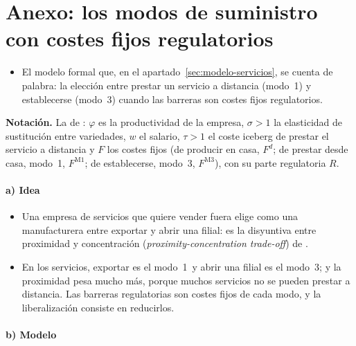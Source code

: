 \documentclass[11pt]{article}
\begin{document}
\clearpage
\appendix

\section{Anexo: los modos de suministro\cortetitulo{} con costes fijos regulatorios}\label{anexo:modelo-servicios}

\begin{itemize}
\item El modelo formal que, en el apartado~\ref{sec:modelo-servicios}, se cuenta de palabra: la elección entre prestar un servicio a distancia (modo~1) y establecerse (modo~3) cuando las barreras son costes fijos regulatorios.
\end{itemize}

\begin{anotaciones}
\textbf{Notación.} La de : $\varphi$ es la productividad de la empresa, $\sigma>1$ la elasticidad de sustitución entre variedades, $w$ el salario, $\tau>1$ el coste iceberg de prestar el servicio a distancia y $F$ los costes fijos (de producir en casa, $F^d$; de prestar desde casa, modo~1, $F^{\mathrm{M1}}$; de establecerse, modo~3, $F^{\mathrm{M3}}$), con su parte regulatoria $R$.
\end{anotaciones}

\paragraph{a) Idea}

\begin{itemize}
\item Una empresa de servicios que quiere vender fuera elige como una manufacturera entre exportar y abrir una filial: es la disyuntiva entre proximidad y concentración (\emph{proximity-concentration trade-off}) de \textcite{HelpmanMelitzYeaple2004Export} .
\item En los servicios, exportar es el modo~1~y abrir una filial es el modo~3; y la proximidad pesa mucho más, porque muchos servicios no se pueden prestar a distancia. Las barreras regulatorias son costes fijos de cada modo, y la liberalización consiste en reducirlos\nocite{KoxNordas2007Services,FrancoisHoekman2010Services}.
\end{itemize}

\paragraph{b) Modelo}
\end{document}
